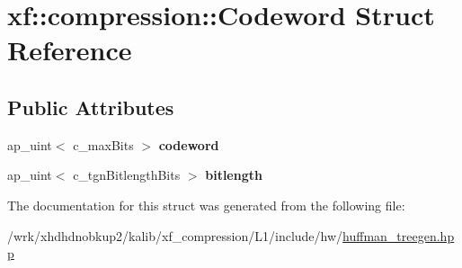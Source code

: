 \hypertarget{structxf_1_1compression_1_1Codeword}{\section{xf\-:\-:compression\-:\-:Codeword Struct Reference}
\label{structxf_1_1compression_1_1Codeword}
}
\subsection*{Public Attributes}
\begin{DoxyCompactItemize}
\item 
\hypertarget{structxf_1_1compression_1_1Codeword_a6045eb37d7c73f8a4ea0e644fc151662}{ap\-\_\-uint$<$ c\-\_\-max\-Bits $>$ {\bfseries codeword}}\label{structxf_1_1compression_1_1Codeword_a6045eb37d7c73f8a4ea0e644fc151662}

\item 
\hypertarget{structxf_1_1compression_1_1Codeword_a1833cbef40b9839df77d45984b6879f1}{ap\-\_\-uint$<$ c\-\_\-tgn\-Bitlength\-Bits $>$ {\bfseries bitlength}}\label{structxf_1_1compression_1_1Codeword_a1833cbef40b9839df77d45984b6879f1}

\end{DoxyCompactItemize}


The documentation for this struct was generated from the following file\-:\begin{DoxyCompactItemize}
\item 
/wrk/xhdhdnobkup2/kalib/xf\-\_\-compression/\-L1/include/hw/\hyperlink{huffman__treegen_8hpp}{huffman\-\_\-treegen.\-hpp}\end{DoxyCompactItemize}
